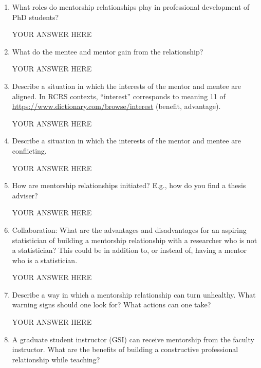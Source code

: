 \documentclass[12pt]{article}
\begin{document}
\begin{enumerate}
\item What roles do mentorship relationships play in professional development of PhD students? 

YOUR ANSWER HERE

\item What do the mentee and mentor gain from the relationship?

YOUR ANSWER HERE

\item Describe a situation in which the interests of the mentor and mentee are aligned. In RCRS contexts, ``interest'' corresponds to meaning 11 of \url{https://www.dictionary.com/browse/interest} (benefit, advantage).

YOUR ANSWER HERE

\item Describe a situation in which the interests of the mentor and mentee are conflicting. 

YOUR ANSWER HERE

\item How are mentorship relationships initiated? E.g., how do you find a thesis adviser?

YOUR ANSWER HERE

\item Collaboration: What are the advantages and disadvantages for an aspiring statistician of building a mentorship relationship with a researcher who is not a statistician? This could be in addition to, or instead of, having a mentor who is a statistician.

YOUR ANSWER HERE

\item Describe a way in which a mentorship relationship can turn unhealthy. What warning signs should one look for? What actions can one take?

YOUR ANSWER HERE

\item A graduate student instructor (GSI) can receive mentorship from the faculty instructor. What are the benefits of building a constructive professional relationship while teaching?
  
\end{enumerate}
\end{document}
